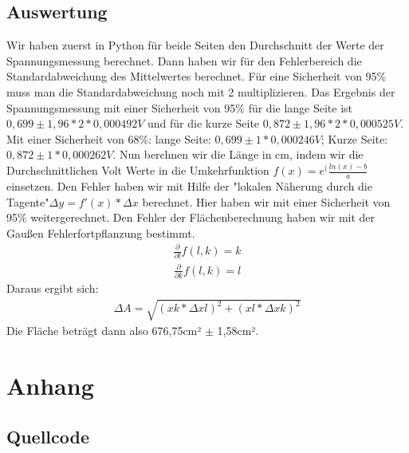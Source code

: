 \documentclass[12pt, oneside, a4paper, \docLanguage]{report}
\begin{document}
\section{Auswertung}
\label{chap:VERSUCH_3_AUSWERTUNG}
\begin{normalsize}
Wir haben zuerst in Python für beide Seiten den Durchschnitt der Werte der Spannungsmessung berechnet. Dann haben wir für den Fehlerbereich die Standardabweichung des Mittelwertes berechnet. Für eine Sicherheit von 95\% muss man die Standardabweichung noch mit 2 multiplizieren. Das Ergebnis der Spannungsmessung mit einer Sicherheit von 95\% für die lange Seite ist $0,699 \pm 1,96 * 2 * 0,000492V$ und für die kurze Seite $0,872 \pm 1,96 * 2 * 0,000525V$.
Mit einer Sicherheit von 68\%: lange Seite: $0,699 \pm 1 * 0,000246V$; Kurze Seite: $0,872 \pm 1 * 0,000262V$.
Nun berchnen wir die Länge in cm, indem wir die Durchschnittlichen Volt Werte in die Umkehrfunktion $f(x)=e^(\frac{ln(x)-b}{a}$ einsetzen. Den Fehler haben wir mit Hilfe der "lokalen Näherung durch die Tagente"\enspace $\Delta y = f'(x) * \Delta x$ berechnet. Hier haben wir mit einer Sicherheit von 95\% weitergerechnet.
Den Fehler der Flächenberechnung haben wir mit der Gaußen Fehlerfortpflanzung bestimmt.\\
\begin{align*}
\frac{\partial}{\partial l}f(l,k) = k
\end{align*}
\begin{align*}
\frac{\partial}{\partial k}f(l,k) = l
\end{align*}
Daraus ergibt sich:
\begin{align*}
\Delta A = \sqrt{(xk * \Delta xl)^2 + (xl * \Delta xk)^2}
\end{align*}
\newline
Die Fläche beträgt dann also 676,75cm² $\pm$ 1,58cm².
\end{normalsize}

%
%
\renewcommand\thesection{A.\arabic{section}}
\renewcommand\thesubsection{\thesection.\arabic{subsection}}

\chapter*{Anhang}
\label{chap:APPENDIX}
\addtocounter{chapter}{1}
\setcounter{section}{0}

\section{Quellcode}
\label{chap:APPENDIX_SOURCECODE}
\end{document}
